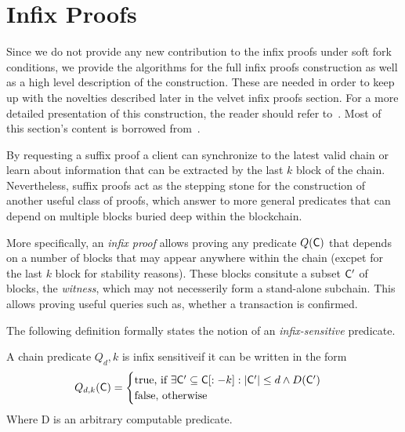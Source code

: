 \section{Infix Proofs}
Since we do not provide any new contribution to the infix proofs under soft fork conditions, we provide the algorithms for the full infix proofs construction as well as a high level description of the construction. These are needed in order to keep up with the novelties described later in the velvet infix proofs section. For a more detailed presentation of this construction, the reader should refer to~\cite{nipopows}. Most of this section's content is borrowed from~\cite{nipopows}.

By requesting a suffix proof a client can synchronize to the latest valid chain or learn about information that can be extracted by the last $k$ block of the chain. Nevertheless, suffix proofs act as the stepping stone for the construction of another useful class of proofs, which answer to more general predicates that can depend on multiple blocks buried deep within the blockchain.

More specifically, an \emph{infix proof} allows proving any predicate $Q(\mathsf{C})$ that depends on a number of blocks that may appear anywhere within the chain (excpet for the last $k$ block for stability reasons). These blocks consitute a subset $\mathsf{C}'$ of blocks, the \emph{witness}, which may not necesserily form a stand-alone subchain. This allows proving useful queries such as, whether a transaction is confirmed.

The following definition formally states the notion of an \emph{infix-sensitive} predicate.

\begin{definition}
    A chain predicate $Q_d,k$ is infix sensitiveif it can be written in the form 
    \begin{equation*}
        Q_{d,k}(\mathsf{C}) =
        \begin{cases}
             \text{true, if } \exists \mathsf{C}' \subseteq \mathsf{C}[:-k] : \lvert \mathsf{C}' \rvert \leq d \wedge D(\mathsf{C}')\\
            \text{false, otherwise}
        \end{cases}
    \end{equation*}
    Where D is an arbitrary computable predicate.
\end{definition}

